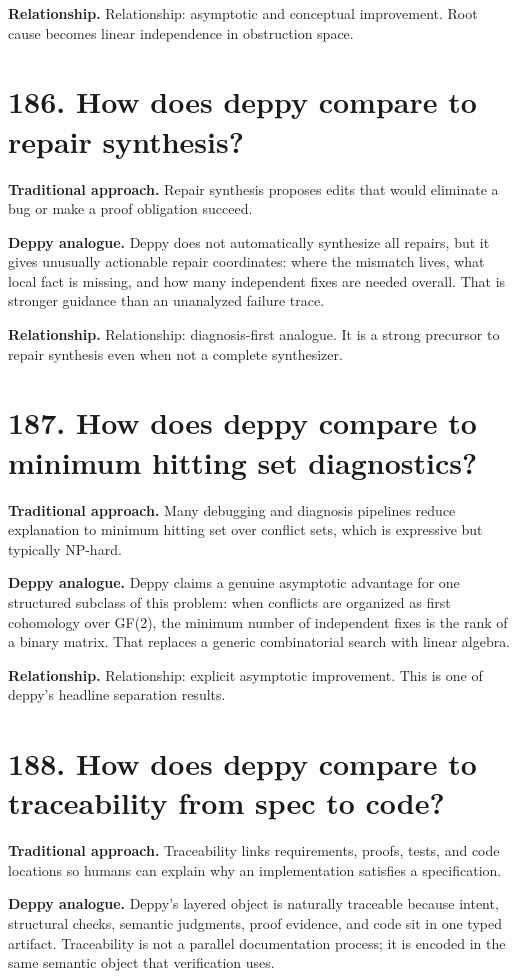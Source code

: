 \documentclass[11pt,openany]{book}
\begin{document}
\textbf{Relationship.} Relationship: asymptotic and conceptual improvement. Root cause becomes linear independence in obstruction space.

\section*{186. How does deppy compare to repair synthesis?}
\textbf{Traditional approach.} Repair synthesis proposes edits that would eliminate a bug or make a proof obligation succeed.

\textbf{Deppy analogue.} Deppy does not automatically synthesize all repairs, but it gives unusually actionable repair coordinates: where the mismatch lives, what local fact is missing, and how many independent fixes are needed overall. That is stronger guidance than an unanalyzed failure trace.

\textbf{Relationship.} Relationship: diagnosis-first analogue. It is a strong precursor to repair synthesis even when not a complete synthesizer.

\section*{187. How does deppy compare to minimum hitting set diagnostics?}
\textbf{Traditional approach.} Many debugging and diagnosis pipelines reduce explanation to minimum hitting set over conflict sets, which is expressive but typically NP-hard.

\textbf{Deppy analogue.} Deppy claims a genuine asymptotic advantage for one structured subclass of this problem: when conflicts are organized as first cohomology over GF(2), the minimum number of independent fixes is the rank of a binary matrix. That replaces a generic combinatorial search with linear algebra.

\textbf{Relationship.} Relationship: explicit asymptotic improvement. This is one of deppy's headline separation results.

\section*{188. How does deppy compare to traceability from spec to code?}
\textbf{Traditional approach.} Traceability links requirements, proofs, tests, and code locations so humans can explain why an implementation satisfies a specification.

\textbf{Deppy analogue.} Deppy's layered object is naturally traceable because intent, structural checks, semantic judgments, proof evidence, and code sit in one typed artifact. Traceability is not a parallel documentation process; it is encoded in the same semantic object that verification uses.
\end{document}
